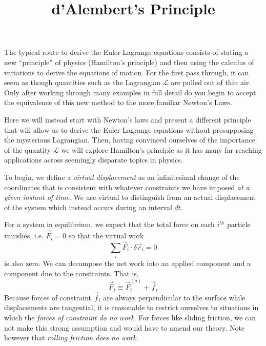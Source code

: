 \documentclass{article}
\title{d'Alembert's Principle}
\begin{document}
\maketitle

The typical route to derive the Euler-Lagrange equations consists of stating a
new ``principle'' of physics (Hamilton's principle) and then using the calculus
of variations to derive the equations of motion. For the first pass through, it
can seem as though quantities such as the Lagrangian $\mathcal{L}$ are pulled
out of thin air. Only after working through many examples in full detail do you
begin to accept the equivalence of this new method to the more familiar Newton's
Laws.

Here we will instead start with Newton's laws and present a different principle
that will allow us to derive the Euler-Lagrange equations without presupposing
the mysterious Lagrangian. Then, having convinced ourselves of the importance of
the quantity $\mathcal{L}$ we will explore Hamilton's principle as it has many
far reaching applications across seemingly disparate topics in physics.

To begin, we define a \textit{virtual displacement} as an infinitesimal change
of the coordinates that is consistent with whatever constraints we have imposed
\emph{at a given instant of time}. We use virtual to distinguish from an actual
displacement of the system which instead occurs during an interval $dt$.

For a system in equilibrium, we expect that the total force on each $i^{th}$
particle vanishes, i.e. $\vec{F}_i = 0$ so that the virtual work
\begin{equation}
  \sum_i \vec{F}_i \cdot \delta \vec{r}_i = 0
\end{equation}
is also zero. We can decompose the net work into an applied component and a
component due to the constraints. That is,
\begin{equation}
  \vec{F}_i \equiv \vec{F}_i^{(a)} + \vec{f}_i
\end{equation}
Because forces of constraint $\vec{f}_i$ are always perpendicular to the surface
while displacements are tangential, it is reasonable to restrict ourselves to
situations in which the \emph{forces of constraint do no work}. For forces like
sliding friction, we can not make this strong assumption and would have to amend our
theory. Note however that \emph{rolling friction does no work}.
\end{document}

